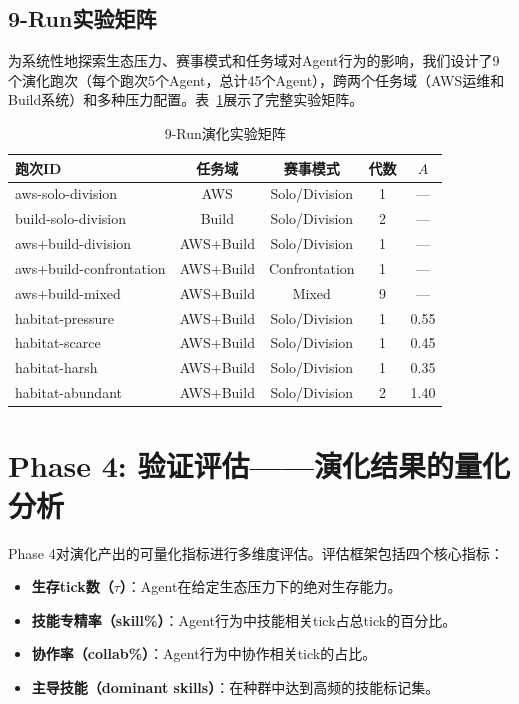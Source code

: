 \documentclass[12pt,a4paper]{ctexart}
\begin{document}
\subsection{9-Run实验矩阵}

为系统性地探索生态压力、赛事模式和任务域对Agent行为的影响，我们设计了9个演化跑次（每个跑次5个Agent，总计45个Agent），跨两个任务域（AWS运维和Build系统）和多种压力配置。表~\ref{tab:config}展示了完整实验矩阵。

\begin{table}[H]
\centering
\caption{9-Run演化实验矩阵}
\label{tab:config}
\renewcommand{\arraystretch}{1.15}
\begin{tabular}{lcccc}
\toprule
跑次ID & 任务域 & 赛事模式 & 代数 & $A$ \\
\midrule
aws-solo-division  & AWS    & Solo/Division & 1 & --- \\
build-solo-division & Build  & Solo/Division & 2 & --- \\
aws+build-division  & AWS+Build & Solo/Division & 1 & --- \\
aws+build-confrontation & AWS+Build & Confrontation & 1 & --- \\
aws+build-mixed     & AWS+Build & Mixed & 9 & --- \\
habitat-pressure    & AWS+Build & Solo/Division & 1 & 0.55 \\
habitat-scarce      & AWS+Build & Solo/Division & 1 & 0.45 \\
habitat-harsh       & AWS+Build & Solo/Division & 1 & 0.35 \\
habitat-abundant    & AWS+Build & Solo/Division & 2 & 1.40 \\
\bottomrule
\end{tabular}
\end{table}

\section{Phase 4: 验证评估——演化结果的量化分析}

Phase 4对演化产出的可量化指标进行多维度评估。评估框架包括四个核心指标：
\begin{itemize}[nosep]
\item \textbf{生存tick数（$\tau$）}：Agent在给定生态压力下的绝对生存能力。
\item \textbf{技能专精率（skill\%）}：Agent行为中技能相关tick占总tick的百分比。
\item \textbf{协作率（collab\%）}：Agent行为中协作相关tick的占比。
\item \textbf{主导技能（dominant skills）}：在种群中达到高频的技能标记集。
\end{itemize}
\end{document}
